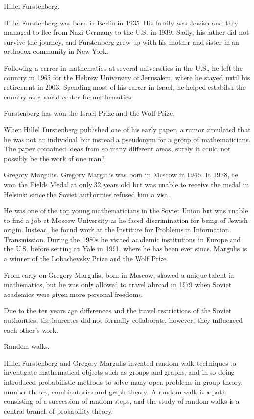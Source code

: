 Hillel Furstenberg.

Hillel Furstenberg was born in Berlin in 1935.
His family was Jewish and they managed to
flee from Nazi Germany to the U.S. in 1939.
Sadly, his father did not survive the
journey, and Furstenberg grew up with his
mother and sister in an orthodox community
in New York.

Following a carrer in mathematics at
several universities in the U.S., he left
the country in 1965 for the Hebrew
University of Jerusalem, where he stayed
until his retirement in 2003.
Spending most of his career in Israel,
he helped estabilsh the country as a world
center for mathematics.

Furstenberg has won the Israel Prize
and the Wolf Prize.

When Hillel Furstenberg published one of
his early paper, a rumor circulated that
he was not an individual but instead a
pseudonym for a group of mathematicians.
The paper contained ideas from so many
different areas, surely it could not
possibly be the work of one man?

Gregory Margulis.
Gregory Margulis was born in Moscow in 1946.
In 1978, he won the Fields Medal at only 32
years old but was unable to receive the
medal in Helsinki since the Soviet
authorities refused him a visa.

He was one of the top young
mathematicians in the Soviet Union but was
unable to find a job at Moscow University
as he faced discrimination for being
of Jewish origin. Instead, he found
work at the Institute for Problems
in Information Transmission. During
the 1980s he visited academic institutions
in Europe and the U.S. before setting at
Yale in 1991, where he has been ever since.
Margulis is a winner of the Lobachevsky
Prize and the Wolf Prize.

From early on Gregory Margulis, born in
Moscow, showed a unique talent in
mathematics, but he was only allowed to
travel abroad in 1979 when Soviet academics
were given more personal freedoms.

Due to the ten years age differences and the
travel restrictions of the Soviet authorities,
the laureates did not formally collaborate,
however, they influenced each other's work.

Random walks.

Hillel Furstenberg and Gregory Margulis
invented random walk techniques to
inventigate mathematical objects such as
groups and graphs, and in so doing
introduced probabilistic methods to solve
many open problems in group theory,
number theory, combinatorics and graph
theory. A random walk is a path consisting
of a succession of random steps, and the
study of random walks is a central branch of
probability theory.


